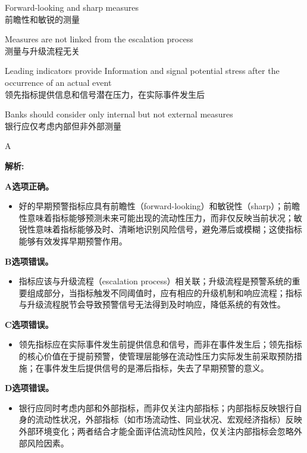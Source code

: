\documentclass{article}
\newenvironment{explanation}
{\textbf{解析:}\par}
{\par}
\begin{document}
\begin{choices}
    \item Forward-looking and sharp measures\\
    前瞻性和敏锐的测量
    \item Measures are not linked from the escalation process\\
    测量与升级流程无关
    \item Leading indicators provide Information and signal potential stress after the occurrence of an actual event\\
    领先指标提供信息和信号潜在压力，在实际事件发生后
    \item Banks should consider only internal but not external measures\\
    银行应仅考虑内部但非外部测量
\end{choices}

\begin{correctanswer}
    A
\end{correctanswer}

\begin{explanation}
    \textbf{A选项正确。}
    \begin{itemize}
        \item 好的早期预警指标应具有前瞻性（forward-looking）和敏锐性（sharp）；前瞻性意味着指标能够预测未来可能出现的流动性压力，而非仅反映当前状况；敏锐性意味着指标能够及时、清晰地识别风险信号，避免滞后或模糊；这使指标能够有效发挥早期预警作用。
    \end{itemize}

    \textbf{B选项错误。}
    \begin{itemize}
        \item 指标应该与升级流程（escalation process）相关联；升级流程是预警系统的重要组成部分，当指标触发不同阈值时，应有相应的升级机制和响应流程；指标与升级流程脱节会导致预警信号无法得到及时响应，降低系统的有效性。
    \end{itemize}

    \textbf{C选项错误。}
    \begin{itemize}
        \item 领先指标应在实际事件发生前提供信息和信号，而非在事件发生后；领先指标的核心价值在于提前预警，使管理层能够在流动性压力实际发生前采取预防措施；在事件发生后提供信号的是滞后指标，失去了早期预警的意义。
    \end{itemize}

    \textbf{D选项错误。}
    \begin{itemize}
        \item 银行应同时考虑内部和外部指标，而非仅关注内部指标；内部指标反映银行自身的流动性状况，外部指标（如市场流动性、同业状况、宏观经济指标）反映外部环境变化；两者结合才能全面评估流动性风险，仅关注内部指标会忽略外部风险因素。
    \end{itemize}
\end{explanation}
\end{document}
